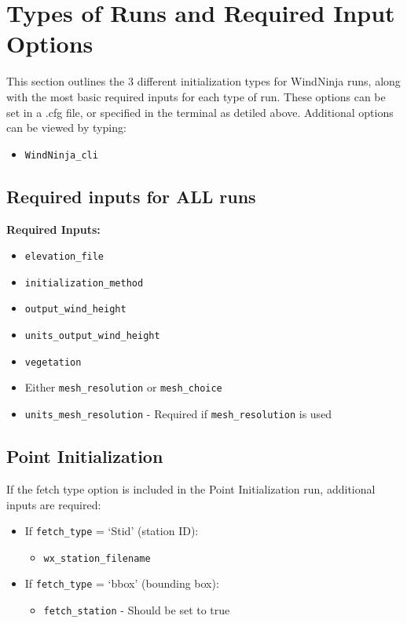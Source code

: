 \section*{Types of Runs and Required Input Options}

This section outlines the 3 different initialization types for WindNinja runs, along with the most basic required inputs for each type of run. These options can be set in a .cfg file, or specified in the terminal as detiled above. Additional options can be viewed by typing: 
\begin{itemize}
\item[]\texttt{WindNinja\_cli} 
\end{itemize}



\subsection*{Required inputs for ALL runs}

\textbf{Required Inputs:}
\begin{itemize}
    \item \texttt{elevation\_file}
    \item \texttt{initialization\_method}
    \item \texttt{output\_wind\_height}
    \item \texttt{units\_output\_wind\_height}
    \item \texttt{vegetation}
    \item Either \texttt{mesh\_resolution} or \texttt{mesh\_choice}
    \item \texttt{units\_mesh\_resolution} - Required if \texttt{mesh\_resolution} is used
\end{itemize}

\subsection*{Point Initialization}
If the fetch type option is included in the Point Initialization run, additional inputs are required:

\begin{itemize}
    \item If \texttt{fetch\_type} = `Stid' (station ID):
        \begin{itemize}
            \item \texttt{wx\_station\_filename}
        \end{itemize}
                       
    \item If \texttt{fetch\_type} = `bbox' (bounding box):
        \begin{itemize}
            \item \texttt{fetch\_station} - Should be set to true
        \end{itemize}
\end{itemize}





